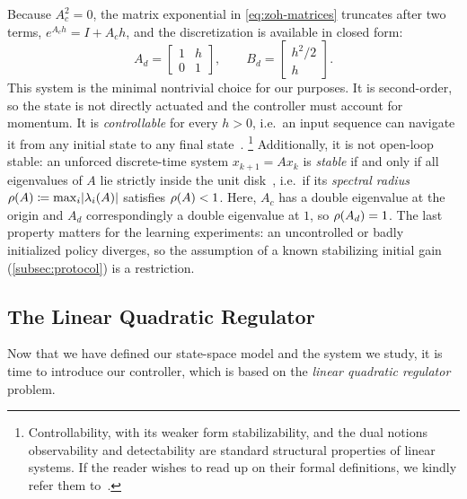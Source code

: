 Because $A_c^{2} = 0$, the matrix exponential in
\eqref{eq:zoh-matrices} truncates after two terms, $e^{A_c h} = I + A_c h$, and
the discretization is available in closed form:
\begin{equation}
    \label{eq:di-disc-matrices}
    A_d = \begin{bmatrix} 1 & h \\ 0 & 1 \end{bmatrix},
    \qquad
    B_d = \begin{bmatrix} h^{2}/2 \\ h \end{bmatrix}.
\end{equation}
This system is the minimal nontrivial choice for our purposes. It is
second-order, so the state is not directly actuated and the controller must
account for momentum. It is \emph{controllable} for every $h > 0$, i.e.\ an input
sequence can navigate it from any initial state to any final
state~\cite[p.~127, Def.~7.2]{Werner2021Control}.%
\footnote{Controllability, with its weaker form stabilizability, and the dual notions
observability and detectability are standard structural properties of linear systems.
If the reader wishes to read up on their formal definitions, we kindly refer them
to~\cite[Chs.~3--4 and pp.~127--129]{Werner2021Control}.}
Additionally, it is not open-loop stable: an unforced discrete-time system $x_{k+1} = A x_k$ is
\emph{stable} if and only if all eigenvalues of $A$ lie strictly inside the unit
disk~\cite[p.~127, Thm.~7.1]{Werner2021Control}, i.e.\ if its \emph{spectral radius}
$\operatorname{\rho}(A) \coloneqq \max_i \lvert \lambda_i(A) \rvert$ satisfies $\operatorname{\rho}(A) < 1$. Here, $A_c$
has a double eigenvalue at the origin and $A_d$ correspondingly a double eigenvalue at $1$,
so $\operatorname{\rho}(A_d) = 1$. The last property matters for the
learning experiments: an uncontrolled or badly initialized policy diverges, so
the assumption of a known stabilizing initial gain (\cref{subsec:protocol}) is a
restriction.
 
\subsection{The Linear Quadratic Regulator}
\label{subsec:lqr}

Now that we have defined our state-space model and the system we
study, it is time to introduce our controller, which is based on the
\emph{linear quadratic regulator} problem.

